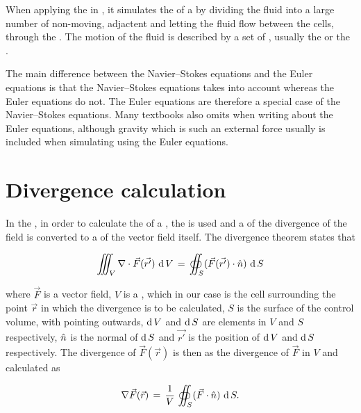 When applying the \FVM in \CFD, it simulates the \flow of a \fluid by dividing the fluid into a large number of non-moving, adjactent \cells and letting the fluid flow between the cells, through the . The motion of the fluid is described by a set of \PDEs, usually the  or the .

The main difference between the Navier--Stokes equations and the Euler equations is that the Navier--Stokes equations takes  into account whe\-reas the Euler equations do not. The Euler equations are therefore a special case of the Navier--Stokes equations. Many textbooks also omits  when writing about the Euler equations, although gravity which is such an external force usually is included when simulating  using the Euler equations.

\section{Divergence calculation}

In the \PDEs, in order to calculate the \divergence of a , the  is used and a  of the divergence of the field is converted to a  of the vector field itself. The divergence theorem states that

\begin{equation} \label{eq:divergence_theorem}
\iiint_V\nabla\cdot\vec{F}(\vec{r'})\,\operatorname{d} V \,=\, \oiint_S(\vec{F}(\vec{r'})\cdot\hat{n})\,\operatorname{d} S
\end{equation}

where $\vec{F}$ is a vector field, $V$ is a , which in our case is the cell surrounding the point $\vec{r}$ in which the divergence is to be calculated, $S$ is the surface of the control volume, with  pointing outwards, $\operatorname{d} V$ and $\operatorname{d} S$ are \infinitesimal elements in $V$ and $S$ respectively, $\hat{n}$ is the normal of $\operatorname{d} S$ and $\vec{r'}$ is the position of $\operatorname{d} V$ and $\operatorname{d} S$ respectively. The divergence of $\vec{F}(\vec{r})$ is then \approximated as the \average divergence of $\vec{F}$ in $V$ and calculated as

\begin{equation} \label{eq:divergence_surface_integral}
\nabla\vec{F}(\vec{r}) \,=\, \frac{1}{V}\,\oiint_S(\vec{F}\cdot\hat{n})\,\operatorname{d} S.
\end{equation}

